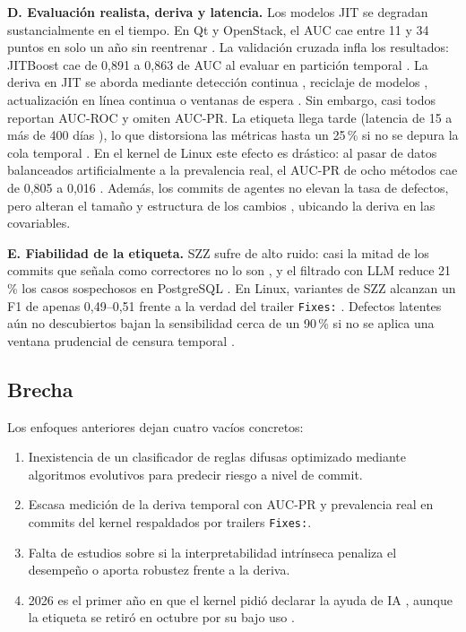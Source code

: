 \textbf{D. Evaluación realista, deriva y latencia.} Los modelos JIT se degradan sustancialmente en el tiempo. En Qt y OpenStack, el AUC cae entre 11 y 34 puntos en solo un año sin reentrenar \cite{McIntosh2018}. La validación cruzada infla los resultados: JITBoost cae de 0,891 a 0,863 de AUC al evaluar en partición temporal \cite{Shehab2023}. La deriva en JIT se aborda mediante detección continua \cite{Chitsazian2026}, reciclaje de modelos \cite{Patel2024}, actualización en línea continua \cite{Olewicki2024} o ventanas de espera \cite{Tian2026}. Sin embargo, casi todos reportan AUC-ROC y omiten AUC-PR. La etiqueta llega tarde (latencia de 15 a más de 400 días \cite{Cabral2019}), lo que distorsiona las métricas hasta un 25\,\% si no se depura la cola temporal \cite{Song2023}. En el kernel de Linux este efecto es drástico: al pasar de datos balanceados artificialmente a la prevalencia real, el AUC-PR de ocho métodos cae de 0,805 a 0,016 \cite{Nguyen2025}. Además, los commits de agentes no elevan la tasa de defectos, pero alteran el tamaño y estructura de los cambios \cite{Mazloomzadeh2026}, ubicando la deriva en las covariables.

\textbf{E. Fiabilidad de la etiqueta.} SZZ sufre de alto ruido: casi la mitad de los commits que señala como correctores no lo son \cite{Herbold2022}, y el filtrado con LLM reduce 21\,\% los casos sospechosos en PostgreSQL \cite{Veras2025}. En Linux, variantes de SZZ alcanzan un F1 de apenas 0,49--0,51 frente a la verdad del trailer \texttt{Fixes:} \cite{Lyu2024}. Defectos latentes aún no descubiertos bajan la sensibilidad cerca de un 90\,\% si no se aplica una ventana prudencial de censura temporal \cite{Falessi2022}.

\subsection{Brecha}
Los enfoques anteriores dejan cuatro vacíos concretos:
\begin{enumerate}
\item Inexistencia de un clasificador de reglas difusas optimizado mediante algoritmos evolutivos para predecir riesgo a nivel de commit.
\item Escasa medición de la deriva temporal con AUC-PR y prevalencia real en commits del kernel respaldados por trailers \texttt{Fixes:}.
\item Falta de estudios sobre si la interpretabilidad intrínseca penaliza el desempeño o aporta robustez frente a la deriva.
\item 2026 es el primer año en que el kernel pidió declarar la ayuda de IA \cite{KernelAdd}, aunque la etiqueta se retiró en octubre por su bajo uso \cite{KernelRemove}.
\end{enumerate}
